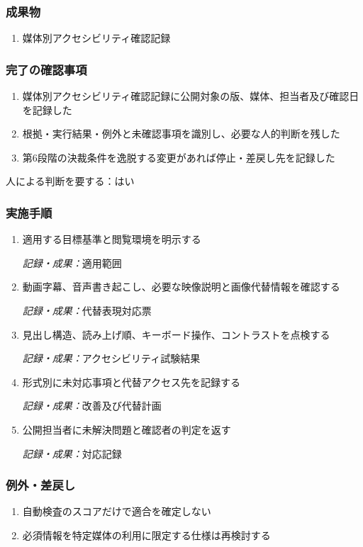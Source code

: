 \documentclass[a4paper,11pt]{article}
\begin{document}
\subsubsection*{成果物}
\begin{enumerate}[leftmargin=2em,itemsep=0.35em]
\item 媒体別アクセシビリティ確認記録
\end{enumerate}
\subsubsection*{完了の確認事項}
\begin{enumerate}[leftmargin=2em,itemsep=0.35em]
\item 媒体別アクセシビリティ確認記録に公開対象の版、媒体、担当者及び確認日を記録した
\item 根拠・実行結果・例外と未確認事項を識別し、必要な人的判断を残した
\item 第6段階の決裁条件を逸脱する変更があれば停止・差戻し先を記録した
\end{enumerate}
\par 人による判断を要する：はい\par\medskip
\subsubsection*{実施手順}
\begin{enumerate}[leftmargin=2em,itemsep=0.65em]
\item 適用する目標基準と閲覧環境を明示する\par\noindent\textit{記録・成果：}適用範囲\nobreak\smallskip
\item 動画字幕、音声書き起こし、必要な映像説明と画像代替情報を確認する\par\noindent\textit{記録・成果：}代替表現対応票\nobreak\smallskip
\item 見出し構造、読み上げ順、キーボード操作、コントラストを点検する\par\noindent\textit{記録・成果：}アクセシビリティ試験結果\nobreak\smallskip
\item 形式別に未対応事項と代替アクセス先を記録する\par\noindent\textit{記録・成果：}改善及び代替計画\nobreak\smallskip
\item 公開担当者に未解決問題と確認者の判定を返す\par\noindent\textit{記録・成果：}対応記録\nobreak\smallskip
\end{enumerate}
\subsubsection*{例外・差戻し}
\begin{enumerate}[leftmargin=2em,itemsep=0.35em]
\item 自動検査のスコアだけで適合を確定しない
\item 必須情報を特定媒体の利用に限定する仕様は再検討する
\end{enumerate}
\end{document}
